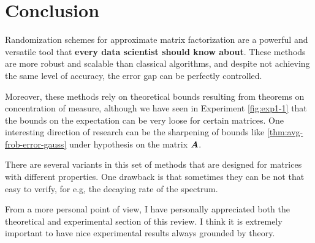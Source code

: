 \documentclass{amsart}
\theoremstyle{definition}
\theoremstyle{remark}
\numberwithin{equation}{section}
\begin{document}
\maketitle






\section*{Conclusion}
Randomization schemes for approximate matrix factorization are a powerful and 
versatile tool that \textbf{every data scientist should know about}.
These methods are more robust and scalable than classical algorithms,
and despite not achieving the same level of accuracy, the error gap can be
perfectly controlled.

Moreover, these methods rely on theoretical bounds resulting from theorems
on concentration of measure,
although we have seen in Experiment \ref{fig:exp1-1} that the bounds on the
expectation can be very loose for certain matrices. One interesting direction
of research can be the sharpening of bounds like \ref{thm:avg-frob-error-gauss}
under hypothesis on the matrix $\bm{A}$.


There are several variants in this set of methods that
are designed for matrices with different properties. One drawback
is that sometimes they can be not that easy to verify, for e.g, the decaying
rate of the spectrum.

From a more personal point of view, I have personally appreciated both the 
theoretical and experimental section of this review. I think it is extremely 
important to have nice experimental results always grounded by theory.

\printbibliography[heading=bibintoc]
% 

% 
\end{document}
